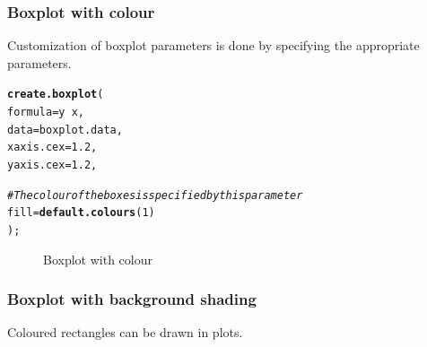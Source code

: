 \documentclass[letterpaper]{article}\usepackage[]{graphicx}\usepackage[]{color}
\makeatletter
\newcommand{\hlnum}[1]{\textcolor[rgb]{0.686,0.059,0.569}{#1}}%
\newcommand{\hlcom}[1]{\textcolor[rgb]{0.678,0.584,0.686}{\textit{#1}}}%
\newcommand{\hlopt}[1]{\textcolor[rgb]{0,0,0}{#1}}%
\newcommand{\hlstd}[1]{\textcolor[rgb]{0.345,0.345,0.345}{#1}}%
\newcommand{\hlkwc}[1]{\textcolor[rgb]{0.333,0.667,0.333}{#1}}%
\newcommand{\hlkwd}[1]{\textcolor[rgb]{0.737,0.353,0.396}{\textbf{#1}}}%
\newenvironment{kframe}{%
 \def\at@end@of@kframe{}%
 \ifinner\ifhmode%
  \def\at@end@of@kframe{\end{minipage}}%
  \begin{minipage}{\columnwidth}%
 \fi\fi%
 \def\FrameCommand##1{\hskip\@totalleftmargin \hskip-\fboxsep
 \colorbox{shadecolor}{##1}\hskip-\fboxsep
     \hskip-\linewidth \hskip-\@totalleftmargin \hskip\columnwidth}%
 \MakeFramed {\advance\hsize-\width
   \@totalleftmargin\z@ \linewidth\hsize
   \@setminipage}}%
 {\par\unskip\endMakeFramed%
 \at@end@of@kframe}
\newenvironment{knitrout}{}{} %
\makeatother
\begin{document}
\subsubsection{Boxplot with colour}
Customization of boxplot parameters is done by specifying the appropriate parameters.
\begin{knitrout}
\color{fgcolor}\begin{kframe}
\begin{alltt}
\hlkwd{create.boxplot}\hlstd{(}
    \hlkwc{formula} \hlstd{= y} \hlopt{~} \hlstd{x,}
    \hlkwc{data} \hlstd{= boxplot.data,}
    \hlkwc{xaxis.cex} \hlstd{=} \hlnum{1.2}\hlstd{,}
    \hlkwc{yaxis.cex} \hlstd{=} \hlnum{1.2}\hlstd{,}

    \hlcom{# The colour of the boxes is specified by this parameter}
    \hlkwc{fill} \hlstd{=} \hlkwd{default.colours}\hlstd{(}\hlnum{1}\hlstd{)}
    \hlstd{);}
\end{alltt}
\end{kframe}\begin{figure}[]


{\centering {} 

}

\caption[Boxplot with colour]{Boxplot with colour\label{fig:boxplot2}}
\end{figure}


\end{knitrout}

\subsubsection{Boxplot with background shading}
Coloured rectangles can be drawn in plots.
\end{document}
